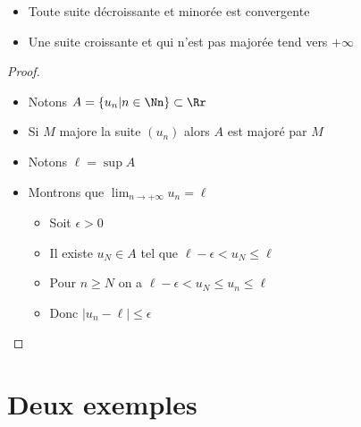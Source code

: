 \begin{frame}
\begin{theoreme}
\end{theoreme}
\pause

  \begin{itemize}
    \item Toute suite décroissante et minorée est convergente
\pause    
    \item Une suite croissante et qui n'est pas majorée tend vers $+\infty$
  \end{itemize}

\pause
\begin{proof}
\begin{itemize}
  \item Notons $A=\left\{ u_n| n\in \Nn\right\} \subset \Rr$
\pause 
  \item Si $M$ majore la suite $(u_n)$ alors $A$ est majoré par $M$
\pause  
  \item Notons $\ell=\sup A$
\pause  
  \item Montrons que $\lim_{n\to +\infty} u_n=\ell$
\pause    
  \begin{itemize}
    \item Soit $\epsilon >0$
    \item Il existe $u_N \in A$ tel que  $\ell-\epsilon < u_N \leq \ell$
    \item Pour $n\geq N$ on a $\ell-\epsilon < u_N \leq u_n \leq \ell$
    \item Donc $\lvert u_n-\ell \rvert \leq \epsilon$ \qedhere
  \end{itemize}

\end{itemize}

\end{proof}

\end{frame}


\section{Deux exemples}

